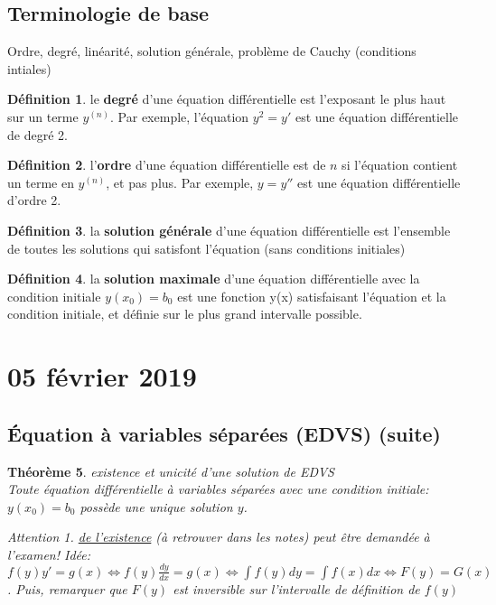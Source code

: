 \documentclass{report}
\theoremstyle{plain}
\newtheorem{thm}{Théorème}[chapter]
\theoremstyle{definition}
\newtheorem{defn}[thm]{Définition}
\theoremstyle{remark}
\newtheorem*{attention}{Attention}
\begin{document}
\subsection{Terminologie de base} %
Ordre, degré, linéarité, solution générale, problème de Cauchy (conditions intiales) \\
\begin{defn} le \textbf{degré} d'une équation différentielle est l'exposant le plus haut sur un terme $y^{(n)}$. Par exemple, l'équation $y^2 = y'$ est une équation différentielle de degré 2. 
\end{defn}
\begin{defn} l'\textbf{ordre} d'une équation différentielle est de $n$ si l'équation contient un terme en $y^{(n)}$, et pas plus. Par exemple, $y = y''$ est une équation différentielle d'ordre 2.
\end{defn}
\begin{defn} la \textbf{solution générale} d'une équation différentielle est l'ensemble de toutes les solutions qui satisfont l'équation (sans conditions initiales)
\end{defn}
\begin{defn} la \textbf{solution maximale} d'une équation différentielle avec la condition initiale $y(x_0) = b_0$ est une fonction y(x) satisfaisant l'équation et la condition initiale, et définie sur le plus grand intervalle possible.
\end{defn}

\section{05 février 2019}

\subsection{Équation à variables séparées (EDVS) (suite)}
\begin{thm} existence et unicité d'une solution de EDVS \\
Toute équation différentielle à variables séparées avec une condition initiale: $y(x_0) = b_0$ possède une unique solution $y$. \\
\begin{attention} \underline{de l'existence} (à retrouver dans les notes) peut être demandée à l'examen! Idée: $f(y)y' = g(x) \iff f(y)\frac{dy}{dx} = g(x) \iff \int f(y)dy = \int f(x)dx \iff F(y) = G(x)$. Puis, remarquer que $F(y)$ est inversible sur l'intervalle de définition de $f(y)$
\end{attention}
\end{thm}
\end{document}
